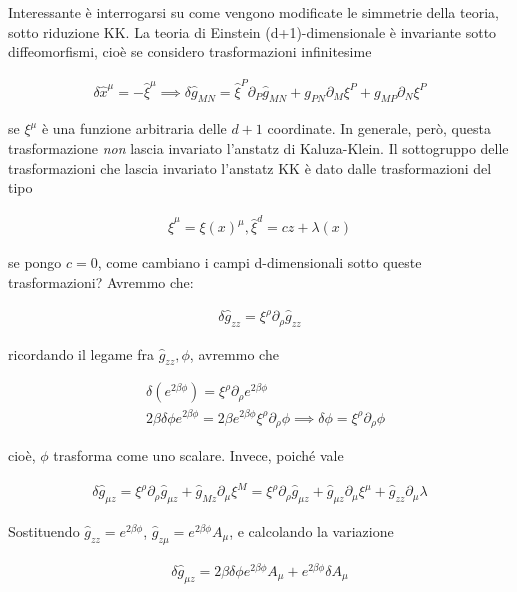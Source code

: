 \documentclass{report}
\begin{document}
Interessante è interrogarsi su come vengono modificate le simmetrie della teoria, sotto riduzione KK. La teoria di Einstein (d+1)-dimensionale è invariante sotto diffeomorfismi, cioè se considero trasformazioni infinitesime

\begin{align}
    \delta \hat{x}^\mu = -\hat{\xi}^\mu \implies \delta \hat{g}_{MN} = \hat{\xi}^P \partial_P \hat{g}_{MN} + g_{PN}\partial_M \xi^P + g_{MP}\partial_N \xi^P
\end{align}

se \(\xi^\mu\) è una funzione arbitraria delle \(d+1\) coordinate. In generale, però, questa trasformazione \emph{non} lascia invariato l'anstatz di Kaluza-Klein. Il sottogruppo delle trasformazioni che lascia invariato l'anstatz KK è dato dalle trasformazioni del tipo 

\begin{align}
    \hat{\xi}^\mu = \xi(x)^\mu, \hat{\xi}^d = cz + \lambda(x)
\end{align}

se pongo \(c=0\), come cambiano i campi d-dimensionali sotto queste trasformazioni? Avremmo che: 

\begin{align}
    \delta \hat{g}_{zz} = \xi^\rho\partial_\rho \hat{g}_{zz}
\end{align}

ricordando il legame fra \(\hat{g}_{zz}, \phi\), avremmo che 

\begin{align}
    &\delta(e^{2\beta\phi}) = \xi^\rho \partial_\rho e^{2\beta \phi} \\
    &2\beta\delta\phi e^{2\beta\phi} = 2\beta e^{2\beta\phi}\xi^\rho\partial_\rho \phi \implies \delta\phi = \xi^\rho\partial_\rho \phi
\end{align}

cioè, \(\phi\) trasforma come uno scalare. Invece, poiché vale 

\begin{align}
    \delta\hat{g}_{\mu z} = \xi^\rho \partial_\rho \hat{g}_{\mu z} + \hat{g}_{M z}\partial_\mu \xi^M = \xi^\rho \partial_\rho \hat{g}_{\mu z} + \hat{g}_{\mu z}\partial_\mu \xi^\mu + \hat{g}_{zz}\partial_\mu \lambda  
\end{align}

Sostituendo \(\hat{g}_{zz} = e^{2\beta\phi}\), \(\hat{g}_{z\mu} = e^{2\beta\phi}A_\mu\), e calcolando la variazione 

\begin{align}
    \delta \hat{g}_{\mu z} = 2\beta\delta\phi e^{2\beta\phi}A_\mu + e^{2\beta\phi}\delta A_\mu
\end{align}
\end{document}
